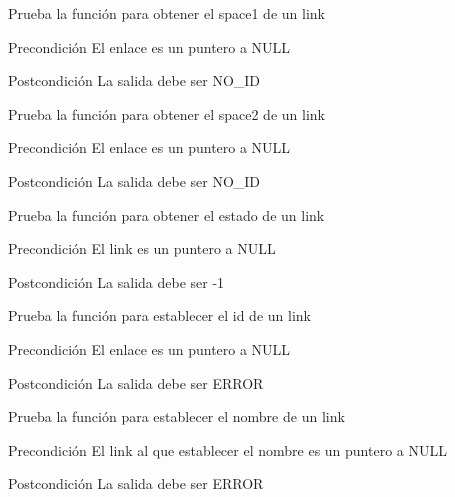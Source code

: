 \begin{DoxyRefList}
\item[\label{test__test000149}%
\hypertarget{test__test000149}{}%
Global \hyperlink{link__test_8c_ac6eb2a7951a5c7eb9ef3706dec2195b2}{test2\-\_\-link\-\_\-get\-\_\-space1} ()]Prueba la función para obtener el space1 de un link \begin{DoxyPrecond}{Precondición}
El enlace es un puntero a N\-U\-L\-L 
\end{DoxyPrecond}
\begin{DoxyPostcond}{Postcondición}
La salida debe ser N\-O\-\_\-\-I\-D  
\end{DoxyPostcond}

\item[\label{test__test000151}%
\hypertarget{test__test000151}{}%
Global \hyperlink{link__test_8c_a338cec1ed0014445c228198bc6807daa}{test2\-\_\-link\-\_\-get\-\_\-space2} ()]Prueba la función para obtener el space2 de un link \begin{DoxyPrecond}{Precondición}
El enlace es un puntero a N\-U\-L\-L 
\end{DoxyPrecond}
\begin{DoxyPostcond}{Postcondición}
La salida debe ser N\-O\-\_\-\-I\-D  
\end{DoxyPostcond}

\item[\label{test__test000153}%
\hypertarget{test__test000153}{}%
Global \hyperlink{link__test_8c_a416dd2a78ad030098da57ff1368196fd}{test2\-\_\-link\-\_\-get\-\_\-state} ()]Prueba la función para obtener el estado de un link \begin{DoxyPrecond}{Precondición}
El link es un puntero a N\-U\-L\-L 
\end{DoxyPrecond}
\begin{DoxyPostcond}{Postcondición}
La salida debe ser -\/1  
\end{DoxyPostcond}

\item[\label{test__test000130}%
\hypertarget{test__test000130}{}%
Global \hyperlink{link__test_8c_a2f107a28c71f764c8091747f48eaec3f}{test2\-\_\-link\-\_\-set\-\_\-id} ()]Prueba la función para establecer el id de un link \begin{DoxyPrecond}{Precondición}
El enlace es un puntero a N\-U\-L\-L 
\end{DoxyPrecond}
\begin{DoxyPostcond}{Postcondición}
La salida debe ser E\-R\-R\-O\-R  
\end{DoxyPostcond}

\item[\label{test__test000133}%
\hypertarget{test__test000133}{}%
Global \hyperlink{link__test_8c_aa66c1e991620a5a758ba6e4d6b4a8b73}{test2\-\_\-link\-\_\-set\-\_\-name} ()]Prueba la función para establecer el nombre de un link \begin{DoxyPrecond}{Precondición}
El link al que establecer el nombre es un puntero a N\-U\-L\-L 
\end{DoxyPrecond}
\begin{DoxyPostcond}{Postcondición}
La salida debe ser E\-R\-R\-O\-R  
\end{DoxyPostcond}


\end{DoxyRefList}
